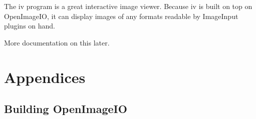 \documentclass[11pt,letterpaper]{book}
\def\product{{\sffamily OpenImageIO}\xspace}
\def\ImageInput{{\codefont ImageInput}\xspace}
\begin{document}
The {\cf iv} program is a great interactive image viewer.  Because {\cf
  iv} is built on top on \product, it can display images of any formats
readable by \ImageInput plugins on hand.

\medskip

More documentation on this later.








\part{Appendices}
\begin{appendix}

%
\chapter{Building OpenImageIO}




%

\end{appendix}

\backmatter

%

\printindex
\end{document}
